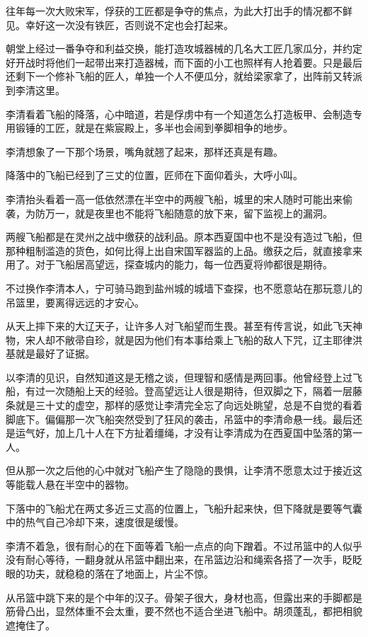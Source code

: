 往年每一次大败宋军，俘获的工匠都是争夺的焦点，为此大打出手的情况都不鲜见。幸好这一次没有铁匠，否则说不定也会打起来。

朝堂上经过一番争夺和利益交换，能打造攻城器械的几名大工匠几家瓜分，并约定好开战时将他们一起带出来打造器械，而下面的小工也照样有人抢着要。只是最后还剩下一个修补飞船的匠人，单独一个人不便瓜分，就给梁家拿了，出阵前又转派到李清这里。

李清看着飞船的降落，心中暗道，若是俘虏中有一个知道怎么打造板甲、会制造专用锻锤的工匠，就是在紫宸殿上，多半也会闹到拳脚相争的地步。

李清想象了一下那个场景，嘴角就翘了起来，那样还真是有趣。

降落中的飞船已经到了三丈的位置，匠师在下面仰着头，大呼小叫。

李清抬头看着一高一低依然漂在半空中的两艘飞船，城里的宋人随时可能出来偷袭，为防万一，就是夜里也不能将飞船随意的放下来，留下监视上的漏洞。

两艘飞船都是在灵州之战中缴获的战利品。原本西夏国中也不是没有造过飞船，但那种粗制滥造的货色，如何比得上出自宋国军器监的上品。缴获之后，就直接拿来用了。对于飞船居高望远，探查城内的能力，每一位西夏将帅都很是期待。

不过换作李清本人，宁可骑马跑到盐州城的城墙下查探，也不愿意站在那玩意儿的吊篮里，要离得远远的才安心。

从天上摔下来的大辽天子，让许多人对飞船望而生畏。甚至有传言说，如此飞天神物，宋人却不敝帚自珍，就是因为他们有本事给乘上飞船的敌人下咒，辽主耶律洪基就是最好了证据。

以李清的见识，自然知道这是无稽之谈，但理智和感情是两回事。他曾经登上过飞船，有过一次随船上天的经验。登高望远让人很是期待，但双脚之下，隔着一层藤条就是三十丈的虚空，那样的感觉让李清完全忘了向远处眺望，总是不自觉的看着脚底下。偏偏那一次飞船突然受到了狂风的袭击，吊篮中的李清命悬一线。最后还是运气好，加上几十人在下方扯着缰绳，才没有让李清成为在西夏国中坠落的第一人。

但从那一次之后他的心中就对飞船产生了隐隐的畏惧，让李清不愿意太过于接近这等能载人悬在半空中的器物。

下落中的飞船尤在两丈多近三丈高的位置上，飞船升起来快，但下降就是要等气囊中的热气自己冷却下来，速度很是缓慢。

李清不着急，很有耐心的在下面等着飞船一点点的向下蹭着。不过吊篮中的人似乎没有耐心等待，一翻身就从吊篮中翻出来，在吊篮边沿和绳索各搭了一次手，眨眨眼的功夫，就稳稳的落在了地面上，片尘不惊。

从吊篮中跳下来的是个中年的汉子。骨架子很大，身材也高，但露出来的手脚都是筋骨凸出，显然体重不会太重，要不然也不适合坐进飞船中。胡须蓬乱，都把相貌遮掩住了。

